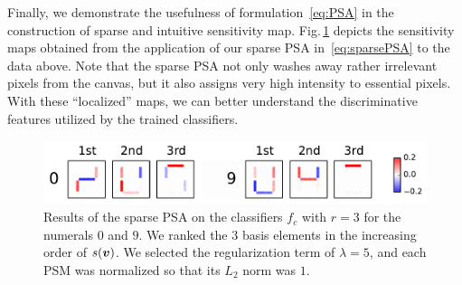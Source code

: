 Finally, we demonstrate the usefulness of formulation~\eqref{eq:PSA} in
the construction of sparse and intuitive sensitivity map.
%
Fig.\,\ref{fig:spsm_digit} depicts the sensitivity maps obtained from the
application of our sparse PSA in~\eqref{eq:sparsePSA} to the data above.
%
Note that the sparse PSA not only washes away rather irrelevant
pixels from the canvas, but it also assigns very high intensity to essential pixels.
%
With these ``localized'' maps, we can better understand the discriminative features
utilized by the trained classifiers.
\begin{figure}[htbp]
 \centering
 \includegraphics[width=0.8\columnwidth]{./fig/fig4.pdf}
 \caption{
 Results of the sparse PSA on the classifiers $f_c$ with $r =
 3$ for the numerals $0$ and $9$.
 We ranked the $3$ basis elements in the increasing order of $s(\mbox{\boldmath $v$})$.
 We selected the regularization term of  $\lambda = 5$,
 and each PSM was normalized so that its $L_2$ norm was $1$.
 }
 \label{fig:spsm_digit}
\end{figure}

